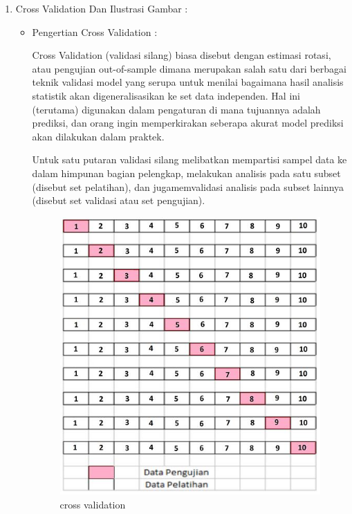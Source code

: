 \begin{enumerate}
\begin{itemize}
\par
\end{itemize}
\item Cross Validation Dan Ilustrasi Gambar	:
\begin{itemize}
\item Pengertian Cross Validation :
\par Cross Validation (validasi silang) biasa disebut dengan estimasi rotasi, atau pengujian out-of-sample dimana merupakan salah satu dari berbagai teknik validasi model yang serupa untuk menilai bagaimana hasil analisis statistik akan digeneralisasikan ke set data independen. Hal ini (terutama) digunakan dalam pengaturan di mana tujuannya adalah prediksi, dan orang ingin memperkirakan seberapa akurat model prediksi akan dilakukan dalam praktek.
\par Untuk satu putaran validasi silang melibatkan mempartisi sampel data ke dalam himpunan bagian pelengkap, melakukan analisis pada satu subset (disebut set pelatihan), dan jugamemvalidasi analisis pada subset lainnya (disebut set validasi atau set pengujian).
\par

\begin{figure}[ht]
\centering
\includegraphics[scale=0.2]{figures/cross.jpg}
\caption{cross validation}
\label{contoh}
\end{figure}


\end{itemize}
\end{enumerate}
